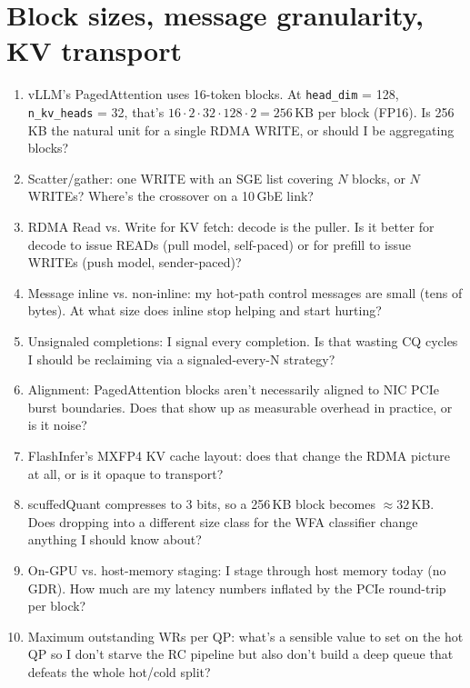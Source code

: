 \documentclass[11pt]{article}
\begin{document}
\section{Block sizes, message granularity, KV transport}

\begin{enumerate}
\item vLLM's PagedAttention uses 16-token blocks. At \texttt{head\_dim}
= 128, \texttt{n\_kv\_heads} = 32, that's $16 \cdot 2 \cdot 32 \cdot
128 \cdot 2 = 256$\,KB per block (FP16). Is 256\,KB the natural
unit for a single RDMA WRITE, or should I be aggregating blocks?

\item Scatter/gather: one WRITE with an SGE list covering $N$ blocks,
or $N$ WRITEs? Where's the crossover on a 10\,GbE link?

\item RDMA Read vs. Write for KV fetch: decode is the puller. Is it
better for decode to issue READs (pull model, self-paced) or for
prefill to issue WRITEs (push model, sender-paced)?

\item Message inline vs. non-inline: my hot-path control messages are
small (tens of bytes). At what size does inline stop helping and start
hurting?

\item Unsignaled completions: I signal every completion. Is that
wasting CQ cycles I should be reclaiming via a signaled-every-N
strategy?

\item Alignment: PagedAttention blocks aren't necessarily aligned to
NIC PCIe burst boundaries. Does that show up as measurable overhead
in practice, or is it noise?

\item FlashInfer's MXFP4 KV cache layout: does that change the RDMA
picture at all, or is it opaque to transport?

\item scuffedQuant compresses to 3 bits, so a 256\,KB block becomes
$\approx 32$\,KB. Does dropping into a different size class for the
WFA classifier change anything I should know about?

\item On-GPU vs. host-memory staging: I stage through host memory
today (no GDR). How much are my latency numbers inflated by the
PCIe round-trip per block?

\item Maximum outstanding WRs per QP: what's a sensible value to set
on the hot QP so I don't starve the RC pipeline but also don't build
a deep queue that defeats the whole hot/cold split?
\end{enumerate}
\end{document}

